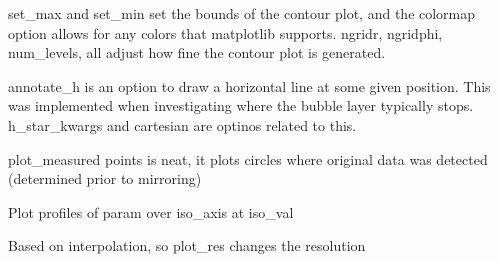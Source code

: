 \documentclass[letterpaper,10pt,english]{sphinxmanual}
\begin{document}
\begin{fulllineitems}
\begin{fulllineitems}
\sphinxAtStartPar
set\_max and set\_min set the bounds of the contour plot, and the colormap option allows for any colors that matplotlib supports. ngridr, ngridphi,
num\_levels, all adjust how fine the contour plot is generated.

\sphinxAtStartPar
annotate\_h is an option to draw a horizontal line at some given position. This was implemented when investigating where the bubble layer typically
stops. h\_star\_kwargs and cartesian are optinos related to this.

\sphinxAtStartPar
plot\_measured points is neat, it plots circles where original data was detected (determined prior to mirroring)

\end{fulllineitems}


\begin{fulllineitems}
\label{\detokenize{api/MARIGOLD.Condition:MARIGOLD.Condition.plot_isoline}}
\pysigstartsignatures
{}
\pysigstopsignatures
\sphinxAtStartPar
Plot profiles of param over iso\_axis at iso\_val

\sphinxAtStartPar
Based on interpolation, so plot\_res changes the resolution

\end{fulllineitems}



\end{fulllineitems}
\end{document}
